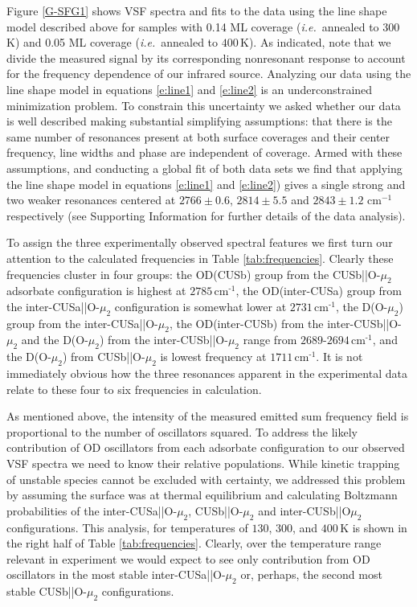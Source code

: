 \documentclass[twoside,twocolumn,9pt]{article}
\begin{document}
Figure \ref{G-SFG1} shows VSF spectra and fits to the data using the line shape model described above for samples with 0.14 ML coverage (\textit{i.e.}\ annealed to $300\,$K) and 0.05 ML coverage (\textit{i.e.}\ annealed to $400\,$K). As indicated, note that we divide the measured signal by its corresponding nonresonant response to account for the frequency dependence of our infrared source. Analyzing our data using the line shape model in equations \ref{e:line1} and \ref{e:line2} is an underconstrained minimization problem. To constrain this uncertainty we asked whether our data is well described making substantial simplifying assumptions: that there is the same number of resonances present at both surface coverages and their center frequency, line widths and phase are independent of coverage. Armed with these assumptions, and conducting a global fit of both data sets we find that applying the line shape model in equations \ref{e:line1} and \ref{e:line2}) gives a single strong and two weaker resonances centered at $2766\pm0.6$, $2814\pm5.5$ and $2843\pm 1.2\text{ cm}^{-1}$ respectively (see Supporting Information for further details of the data analysis).
%

To assign the three experimentally observed spectral features we first turn our attention to the calculated frequencies in Table \ref{tab:frequencies}. Clearly these frequencies cluster in four groups: the OD(CUSb) group from the CUSb||O-$\mu_2$ adsorbate configuration is highest at $2785\,$cm$^{\text{-1}}$, the OD(inter-CUSa) group from the inter-CUSa||O-$\mu_2$ configuration is somewhat lower at $2731\,$cm$^{\text{-1}}$, the D(O-$\mu_2$) group from the inter-CUSa||O-$\mu_2$, the OD(inter-CUSb) from the inter-CUSb||O-$\mu_2$ and the D(O-$\mu_2$) from the inter-CUSb||O-$\mu_2$ range from $2689$-$2694\,$cm$^{\text{-1}}$, and the D(O-$\mu_2$) from CUSb||O-$\mu_2$ is lowest frequency at $1711\,$cm$^{\text{-1}}$. It is not immediately obvious how the three resonances apparent in the experimental data relate to these four to six frequencies in calculation.

As mentioned above, the intensity of the measured emitted sum frequency field is proportional to the number of oscillators squared. To address the likely contribution of OD oscillators from each adsorbate configuration to our observed VSF spectra we need to know their relative populations. While kinetic trapping of unstable species cannot 
 be excluded with certainty,
we addressed this problem by assuming the surface was at thermal equilibrium and calculating Boltzmann probabilities of the inter-CUSa||O-$\mu_2$, CUSb||O-$\mu_2$ and inter-CUSb||O$\mu_2$ configurations. This analysis, for temperatures of $130$, $300$, and $400\,$K is shown in the right half of Table \ref{tab:frequencies}. Clearly, over the temperature range relevant in experiment we would expect to see only contribution from OD oscillators in the most stable inter-CUSa||O-$\mu_2$ or, perhaps, the second most stable CUSb||O-$\mu_2$ configurations.
\end{document}
